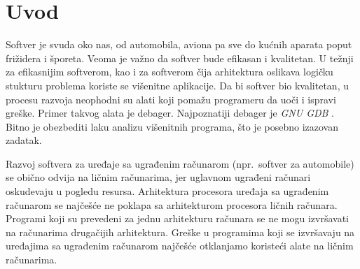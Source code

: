 \documentclass[12pt,oneside]{memoir}
\begin{document}
\frontmatter
\naslovna
\komisija
\apstrakt
\tableofcontents*

\mainmatter

\chapter{Uvod}

Softver je svuda oko nas, od automobila, aviona pa sve do kućnih aparata poput frižidera i šporeta. Veoma je važno da softver bude efikasan i kvalitetan. U težnji za efikasnijim softverom, kao i za softverom čija arhitektura oslikava logičku stukturu problema koriste se višenitne aplikacije. Da bi softver bio kvalitetan, u procesu razvoja neophodni su alati koji pomažu programeru da uoči i ispravi greške. Primer takvog alata je debager. Najpoznatiji debager je \emph{GNU GDB} \cite{GDB}. Bitno je obezbediti laku analizu višenitnih programa, što je posebno izazovan zadatak.

Razvoj softvera za uređaje sa ugrađenim računarom (npr.~softver za automobile) se obično odvija na ličnim računarima, jer uglavnom ugrađeni računari oskudevaju u pogledu resursa. Arhitektura procesora uređaja sa ugrađenim računarom se najčešće ne poklapa sa  arhitekturom procesora ličnih računara. Programi koji su prevedeni za jednu arhitekturu računara se ne mogu izvršavati na računarima drugačijih arhitektura. Greške u programima koji se izvršavaju na uređajima sa ugrađenim računarom najčešće otklanjamo koristeći alate na ličnim računarima.
\end{document}
